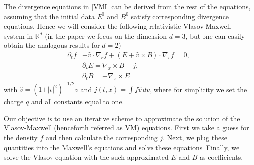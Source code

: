 \documentclass[reqno,a4paper]{amsart}
\theoremstyle{remark}
\numberwithin{equation}{section}
\def\d{\partial}
\def\R{{\mathbb R}}
\begin{document}
The divergence equations in \eqref{VMI} can be derived from the rest of 
the equations, assuming that the initial data $E^0$ and $B^0$ satisfy
corresponding divergence equations.
Hence we will consider the following relativistic 
Vlasov-Maxwell system in $\R^d$
(in the paper we focus on the dimension $d=3$, but one can easily obtain
the analogous results for $d=2$)
\begin{equation}\label{VM_main}
\begin{aligned}
\d_t f &+\hat v\cdot \nabla_x f+(E+\hat{v}\times B)\cdot \nabla_v f=0,\\
&\d_t E=\nabla_x \times B-j,\\
&\d_t B=-\nabla_x \times E
\end{aligned}
\end{equation}
with $\hat v=(1+\vert v\vert^2)^{-1/2} v$ and $j(t,x)= \int f\hat v\, dv$,
where for simplicity we set the charge $q$ and all constants equal to one.

Our objective is to use an iterative scheme to approximate the solution of
the Vlasov-Maxwell (henceforth referred as VM) equations. 
First we take a guess for the density $ f $
and then calculate the corresponding $ j $. 
Next, we plug these quantities into the Maxwell's equations
and solve these equations. Finally, 
we solve the Vlasov equation with the such approximated
$ E $ and $ B $ as coefficients.
\end{document}
